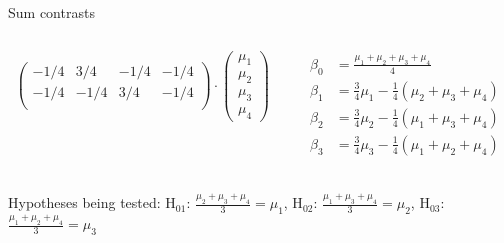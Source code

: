 \documentclass[aspectratio=169]{beamer}
\begin{document}
\begin{frame}{Sum contrasts}
\begin{columns}
\begin{column}[t]{.5\textwidth}
\[\begin{pmatrix}
    -1/4 &  3/4 & -1/4 & -1/4 \\ 
    -1/4 & -1/4 &  3/4 & -1/4 \\ 
  \end{pmatrix} \cdot
  \begin{pmatrix}
    \mu_1 \\
    \mu_2 \\
    \mu_3 \\
    \mu_4
  \end{pmatrix}
\]
    \end{column}
    \begin{column}[t]{.5\textwidth}
\begin{align*}
  \beta_0 & = \frac{\mu_1 + \mu_2 + \mu_3 + \mu_4}{4} \\
  \beta_1 & = \frac{3}{4}\mu_1 - \frac{1}{4}(\mu_2 + \mu_3 + \mu_4)\\
  \beta_2 & = \frac{3}{4}\mu_2 - \frac{1}{4}(\mu_1 + \mu_3 + \mu_4)\\
  \beta_3 & = \frac{3}{4}\mu_3 - \frac{1}{4}(\mu_1 + \mu_2 + \mu_4)\\
\end{align*}
    \end{column}
  \end{columns}
  \vspace{-.8cm}
Hypotheses being tested:
H$_{01}$: $\frac{\mu_2 + \mu_3 + \mu_4}{3} = \mu_1$,
H$_{02}$: $\frac{\mu_1 + \mu_3 + \mu_4}{3} = \mu_2$,
H$_{03}$: $\frac{\mu_1 + \mu_2 + \mu_4}{3} = \mu_3$
\end{frame}
\end{document}
